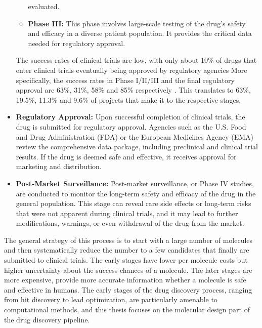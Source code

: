 \begin{itemize}
\begin{itemize}
                        evaluated.
                  \item \textbf{Phase III:} This phase involves large-scale testing of the drug's safety
                        and efficacy in a diverse patient population. It provides the critical data needed for
                        regulatory approval.
            \end{itemize}
            The success rates of clinical trials are low, with only about 10\% of drugs that enter clinical
            trials eventually being approved by regulatory agencies More specifically, the success rates in
            Phase I/II/III and the final regulatory approval are 63\%, 31\%, 58\% and 85\% respectively
            \citep{mullardParsingClinicalSuccess2016}.
            This translates to 63\%, 19.5\%, 11.3\% and 9.6\% of projects that make it to the respective stages.
      \item \textbf{Regulatory Approval:} Upon successful completion of clinical trials, the drug is
            submitted for regulatory approval. Agencies such as the U.S. Food and Drug Administration
            (FDA) or the European Medicines Agency (EMA) review the comprehensive data package, including
            preclinical and clinical trial results. If the drug is deemed safe and effective, it receives
            approval for marketing and distribution.
      \item \textbf{Post-Market Surveillance:} Post-market surveillance, or Phase IV studies, are
            conducted to monitor the long-term safety and efficacy of the drug in the general population.
            This stage can reveal rare side effects or long-term risks that were not apparent during
            clinical trials, and it may lead to further modifications, warnings, or even withdrawal of the
            drug from the market.
\end{itemize}

The general strategy of this process is to start with a large number of molecules and then
systematically reduce the number to a few candidates that finally are submitted to clinical trials.
The early stages have lower per molecule costs but higher uncertainty about the success
chances of a molecule. The later stages are more expensive, provide more accurate information
whether a molecule is safe and effective in humans. The early stages of the
drug discovery process, ranging from hit discovery to lead optimization, are particularly amenable
to computational methods, and this thesis focuses on the molecular design part of the drug discovery
pipeline.

